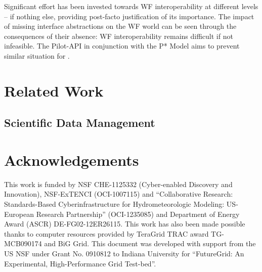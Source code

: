\documentclass{sig-alternate}
\begin{document}

Significant effort has been invested towards WF interoperability at
different levels -- if nothing else, providing post-facto
justification of its importance. The impact of missing interface
abstractions on the WF world can be seen through the consequences of
their absence: WF interoperability remains difficult if not
infeasible. The Pilot-API in conjunction with the P* Model aims to
prevent similar situation for \pilotjobs.




\section{Related Work}


\subsection{Scientific Data Management}



\section*{Acknowledgements}
This work is funded by NSF CHE-1125332 (Cyber-enabled Discovery and
Innovation), NSF-ExTENCI (OCI-1007115) and ``Collaborative Research:
Standards-Based Cyberinfrastructure for Hydrometeorologic Modeling:
US-European Research Partnership'' (OCI-1235085) and Department of
Energy Award (ASCR) DE-FG02-12ER26115.  This work has also been made
possible thanks to computer resources provided by TeraGrid TRAC award
TG-MCB090174 and BiG Grid.  This document was developed with support
from the US NSF under Grant No. 0910812 to Indiana University for
``FutureGrid: An Experimental, High-Performance Grid Test-bed''.

% 


\end{document}
